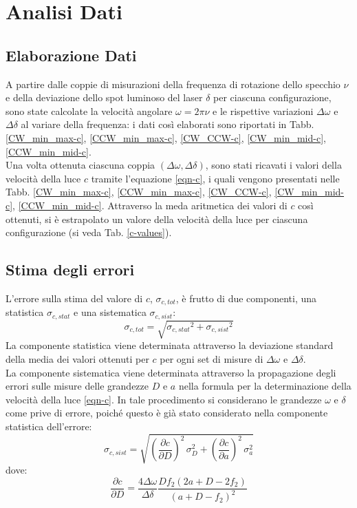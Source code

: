 \documentclass[]{article}
\let\oldsection\section%
\renewcommand{\section}{%
	\renewcommand{\theequation}{\thesection.\arabic{equation}}%
	\oldsection}%
\let\oldsubsection\subsection%
\renewcommand{\subsection}{%
	\renewcommand{\theequation}{\thesubsection.\arabic{equation}}%
	\oldsubsection}%
\begin{document}
    \section{Analisi Dati}

    \subsection{Elaborazione Dati}

    A partire dalle coppie di misurazioni della frequenza di rotazione dello specchio $ \nu $ e della deviazione dello spot luminoso del laser $ \delta $ per ciascuna configurazione, sono state calcolate la velocità angolare $ \omega = 2\pi\nu $ e le rispettive variazioni $ \Delta\omega $ e $ \Delta\delta $ al variare della frequenza: i dati così elaborati sono riportati in Tabb. \ref{CW_min_max-c}, \ref{CCW_min_max-c}, \ref{CW_CCW-c}, \ref{CW_min_mid-c}, \ref{CCW_min_mid-c}. \\
    Una volta ottenuta ciascuna coppia $ \left(\Delta\omega,\Delta\delta\right) $, sono stati ricavati i valori della velocità della luce $c$ tramite l'equazione \ref{eqn-c}, i quali vengono presentati nelle Tabb. \ref{CW_min_max-c}, \ref{CCW_min_max-c}, \ref{CW_CCW-c}, \ref{CW_min_mid-c}, \ref{CCW_min_mid-c}. Attraverso la meda aritmetica dei valori di $c$ così ottenuti, si è estrapolato un valore della velocità della luce per ciascuna configurazione (si veda Tab. \ref{c-values}).

    \subsection {Stima degli errori}

    L'errore sulla stima del valore di $ c $, $ \sigma_{c,tot} $, è frutto di due componenti, una statistica $\sigma_{c,stat}$ e una sistematica $\sigma_{c,sist}$:
    \begin{equation}
        \label{sigma_tot}
        \sigma_{c,tot} = \sqrt{ {\sigma_{c,stat}} ^2 + {\sigma_{c,sist}} ^2 } 
    \end{equation}
    La componente statistica viene determinata attraverso la deviazione standard della media dei valori ottenuti per $c$ per ogni set di misure di $ \Delta \omega $ e $ \Delta \delta $. \\
    La componente sistematica viene determinata attraverso la propagazione degli errori sulle misure delle grandezze $D$ e $a$ nella formula per la determinazione della velocità della luce \ref{eqn-c}. In tale procedimento si considerano le grandezze  $\omega$ e $\delta$ come prive di errore, poiché questo è già stato considerato nella componente statistica dell'errore:
    \begin{equation}
        \label{sigma-sist}
        \sigma_{c,sist} = \sqrt{ \left(\frac{\partial c}{\partial D}\right)^2 \, \sigma_D ^2 + \left(\frac{\partial c}{\partial a}\right)^2 \, \sigma_a ^2 } 
    \end{equation}
    dove:
    \begin{equation}
        \label{eqn-propD}
        \frac{\partial c}{\partial D} = \frac{4\Delta \omega}{\Delta \delta} \frac{D f_2 \left(2a + D -2f_2\right)}{\left(a + D -f_2\right)^2}
    \end{equation}
\end{document}
